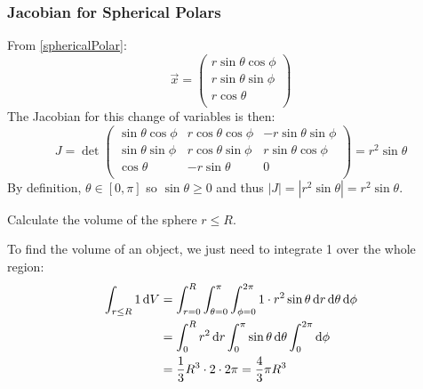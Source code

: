 \documentclass[../main.tex]{subfiles}
\begin{document}
\subsubsection{Jacobian for Spherical Polars}
From \cref{sphericalPolar}:
\[
  \vec{x} = \begin{pmatrix}
  r \sin \theta \cos \phi \\
  r \sin \theta \sin \phi \\
  r \cos \theta \\
  \end{pmatrix}
\]
The Jacobian for this change of variables is then:
\[
  J = \det \begin{pmatrix}
  \sin \theta \cos \phi & r \cos \theta \cos \phi & -r \sin \theta \sin \phi \\
  \sin \theta \sin \phi & r \cos \theta \sin \phi & r \sin \theta \cos \phi \\
  \cos \theta & -r \sin \theta & 0 \\
  \end{pmatrix} = r^2 \sin \theta
\]
By definition, $\theta \in [0, \pi]$ so $\sin \theta \geq 0$ and thus $|J| = |r^2 \sin \theta| = r^2 \sin \theta$.
\begin{example}
  Calculate the volume of the sphere $r \leq R$.

  To find the volume of an object, we just need to integrate 1 over the whole region:
  \begin{align*}
    \int_{r \leq R} 1 \d{V} &= \int_{r = 0}^{R} \int_{\theta = 0}^{\pi} \int_{\phi = 0}^{2\pi} 1 \cdot r^2 \sin \theta \d{r} \d{\theta} \d{\phi} \\
                            &= \int_{0}^{R} r^2 \d{r} \int_{0}^{\pi} \sin \theta \d{\theta} \int_{0}^{2\pi} \d{\phi} \\
                            &= \frac{1}{3}R^3 \cdot 2 \cdot 2\pi = \frac{4}{3}\pi R^3 \\
  \end{align*}
\end{example}
\end{document}
